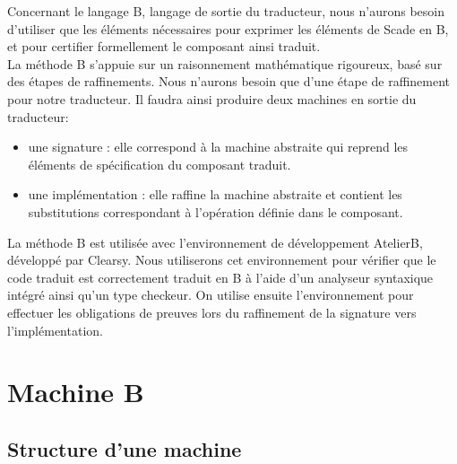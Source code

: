 

Concernant le langage B, langage de sortie du traducteur, nous
n'aurons besoin d'utiliser que les éléments nécessaires pour exprimer
les éléments de Scade en B, et pour certifier formellement le
composant ainsi traduit.\\
La méthode B s'appuie sur un raisonnement mathématique rigoureux, basé
sur des étapes de raffinements. Nous n'aurons besoin que d'une étape de
raffinement pour notre traducteur. Il faudra ainsi produire deux
machines en sortie du traducteur:
\begin{itemize}
\item une signature : elle correspond à la machine abstraite
  qui reprend les éléments de spécification du composant traduit.
\item une implémentation : elle raffine la machine abstraite et
  contient les substitutions correspondant à l'opération définie dans
  le composant.
\end{itemize}
La méthode B est utilisée avec l'environnement de développement
AtelierB, développé par Clearsy. Nous utiliserons cet environnement
pour vérifier que le code traduit est correctement traduit en B à
l'aide d'un analyseur syntaxique intégré ainsi qu'un type checkeur. On
utilise ensuite l'environnement pour effectuer les obligations de
preuves lors du raffinement de la signature vers l'implémentation.




\section{Machine B}

\subsection{Structure d'une machine}

